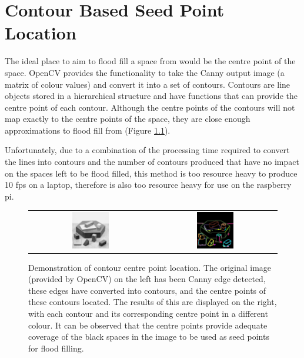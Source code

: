 \chapter{Contour Based Seed Point Location}
\label{appendix:contour}

The ideal place to aim to flood fill a space from would be the centre point of the space. OpenCV provides the functionality to take the Canny output image (a matrix of colour values) and convert it into a set of contours. Contours are line objects stored in a hierarchical structure and have functions that can provide the centre point of each contour. Although the centre points of the contours will not map exactly to the centre points of the space, they are close enough approximations to flood fill from (Figure \ref{fig:ContourCentres}).

Unfortunately, due to a combination of the processing time required to convert the lines into contours and the number of contours produced that have no impact on the spaces left to be flood filled, this method is too resource heavy to produce 10 fps on a laptop, therefore is also too resource heavy for use on the raspberry pi.

\begin{figure}[H]
    \begin{center}
    \begin{tabular}{ c c }
        \includegraphics[width=0.31\textwidth]{Figures/blox.jpg} &
        \includegraphics[width=0.31\textwidth]{Figures/ContourCentres.jpg}
    \end{tabular}
    \caption[Demonstration of contour centre point location]{Demonstration of contour centre point location. The original image (provided by OpenCV) on the left has been Canny edge detected, these edges have converted into contours, and the centre points of these contours located. The results of this are displayed on the right, with each contour and its corresponding centre point in a different colour. It can be observed that the centre points provide adequate coverage of the black spaces in the image to be used as seed points for flood filling.}
    \label{fig:ContourCentres}
    \end{center}
\end{figure}
